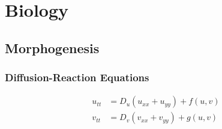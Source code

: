 \section{Biology}

\subsection{Morphogenesis}

\subsubsection{Diffusion-Reaction Equations}

\begin{eqnarray}
u_{tt} &= D_u (u_{xx} + u_{yy}) + f(u,v)  \\
v_{tt} &= D_v (v_{xx} + v_{yy}) + g(u,v) 
\end{eqnarray}





